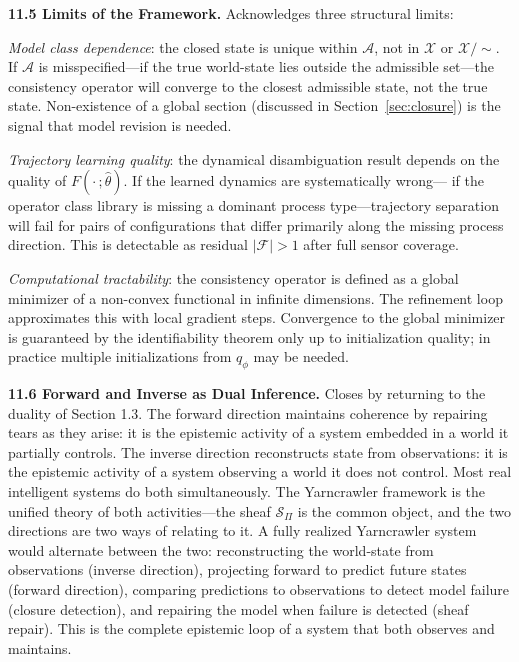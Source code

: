 \documentclass[12pt, oneside]{article}
\newcommand{\Xmod}{\mathcal{X}/{\sim}}
\begin{document}
{\medskip
\textbf{11.5 Limits of the Framework.}
Acknowledges three structural limits:

\textit{Model class dependence}: the closed state is unique within $\mathcal{A}$, not in
$\mathcal{X}$ or $\Xmod$. If $\mathcal{A}$ is misspecified---if the true world-state lies
outside the admissible set---the consistency operator will converge to the closest
admissible state, not the true state. Non-existence of a global section (discussed in
Section~\ref{sec:closure}) is the signal that model revision is needed.

\textit{Trajectory learning quality}: the dynamical disambiguation result depends on the
quality of $F(\cdot\,;\hat{\theta})$. If the learned dynamics are systematically wrong---
if the operator class library is missing a dominant process type---trajectory separation
will fail for pairs of configurations that differ primarily along the missing process
direction. This is detectable as residual $|\mathcal{F}| > 1$ after full sensor coverage.

\textit{Computational tractability}: the consistency operator is defined as a global
minimizer of a non-convex functional in infinite dimensions. The refinement loop
approximates this with local gradient steps. Convergence to the global minimizer is
guaranteed by the identifiability theorem only up to initialization quality; in practice
multiple initializations from $q_\phi$ may be needed.

\medskip
\textbf{11.6 Forward and Inverse as Dual Inference.}
Closes by returning to the duality of Section 1.3. The forward direction maintains
coherence by repairing tears as they arise: it is the epistemic activity of a system
embedded in a world it partially controls. The inverse direction reconstructs state from
observations: it is the epistemic activity of a system observing a world it does not
control. Most real intelligent systems do both simultaneously. The Yarncrawler framework
is the unified theory of both activities---the sheaf $\mathcal{S}_\Pi$ is the common
object, and the two directions are two ways of relating to it. A fully realized Yarncrawler
system would alternate between the two: reconstructing the world-state from observations
(inverse direction), projecting forward to predict future states (forward direction),
comparing predictions to observations to detect model failure (closure detection), and
repairing the model when failure is detected (sheaf repair). This is the complete
epistemic loop of a system that both observes and maintains.
}
\end{document}
